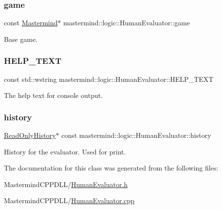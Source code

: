 \subsubsection{\texorpdfstring{game}{game}}
{\footnotesize\ttfamily const \hyperlink{classmastermind_1_1logic_1_1_mastermind}{Mastermind}$\ast$ mastermind\+::logic\+::\+Human\+Evaluator\+::game\hspace{0.3cm}{\ttfamily [private]}}



Base game. 

\hypertarget{classmastermind_1_1logic_1_1_human_evaluator_ab85d06a8de3aa8fdee0db9f6880b76f8}{}\label{classmastermind_1_1logic_1_1_human_evaluator_ab85d06a8de3aa8fdee0db9f6880b76f8} 
\subsubsection{\texorpdfstring{H\+E\+L\+P\+\_\+\+T\+E\+XT}{HELP\_TEXT}}
{\footnotesize\ttfamily const std\+::wstring mastermind\+::logic\+::\+Human\+Evaluator\+::\+H\+E\+L\+P\+\_\+\+T\+E\+XT\hspace{0.3cm}{\ttfamily [private]}}



The help text for console output. 

\hypertarget{classmastermind_1_1logic_1_1_human_evaluator_a6929e29801dcca808ee23bf1ad3b39c9}{}\label{classmastermind_1_1logic_1_1_human_evaluator_a6929e29801dcca808ee23bf1ad3b39c9} 
\subsubsection{\texorpdfstring{history}{history}}
{\footnotesize\ttfamily \hyperlink{classmastermind_1_1logic_1_1_read_only_history}{Read\+Only\+History}$\ast$ const mastermind\+::logic\+::\+Human\+Evaluator\+::history\hspace{0.3cm}{\ttfamily [private]}}



History for the evaluator. Used for print. 



The documentation for this class was generated from the following files\+:\begin{DoxyCompactItemize}
\item 
Mastermind\+C\+P\+P\+D\+L\+L/\hyperlink{_human_evaluator_8h}{Human\+Evaluator.\+h}\item 
Mastermind\+C\+P\+P\+D\+L\+L/\hyperlink{_human_evaluator_8cpp}{Human\+Evaluator.\+cpp}\end{DoxyCompactItemize}

